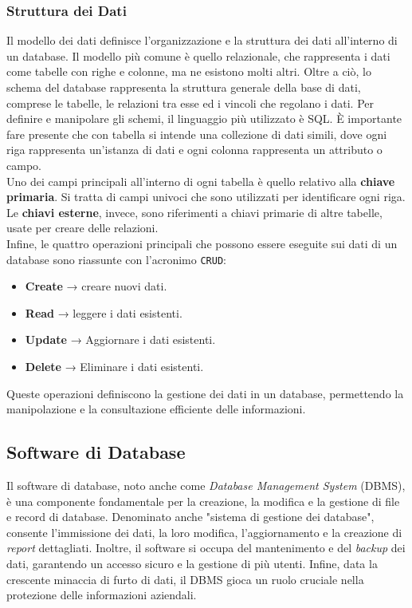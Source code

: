 \subsubsection{Struttura dei Dati}
Il modello dei dati definisce l’organizzazione e la struttura dei dati all’interno di un database. Il modello più comune è quello relazionale, che rappresenta i dati come tabelle con righe e colonne, ma ne esistono molti altri. Oltre a ciò, lo schema del database rappresenta la struttura generale della base di dati, comprese le tabelle, le relazioni tra esse ed i vincoli che regolano i dati. Per definire e manipolare gli schemi, il linguaggio più utilizzato è SQL.\cite{DATABASE_wikipedia} È importante fare presente che con tabella si intende una collezione di dati simili, dove ogni riga rappresenta un’istanza di dati e ogni colonna rappresenta un attributo o campo.\\
Uno dei campi principali all’interno di ogni tabella è quello relativo alla \textbf{chiave primaria}. Si tratta di campi univoci che sono utilizzati per identificare ogni riga. Le \textbf{chiavi esterne}, invece, sono riferimenti a chiavi primarie di altre tabelle, usate per creare delle relazioni.\\
Infine, le quattro operazioni principali che possono essere eseguite sui dati di un database sono riassunte con l’acronimo \texttt{CRUD}:
\begin{itemize}
    \item \textbf{Create} → creare nuovi dati.
    \item \textbf{Read} → leggere i dati esistenti.
    \item \textbf{Update} → Aggiornare i dati esistenti.
    \item \textbf{Delete} → Eliminare i dati esistenti.
\end{itemize}
Queste operazioni definiscono la gestione dei dati in un database,\cite{DATABASE_ionos} permettendo la manipolazione e la consultazione efficiente delle informazioni.

\subsection{Software di Database}

Il software di database, noto anche come \textit{Database Management System} (DBMS), è una componente fondamentale per la creazione, la modifica e la gestione di file e record di database. Denominato anche "sistema di gestione dei database", consente l'immissione dei dati, la loro modifica, l'aggiornamento e la creazione di \textit{report} dettagliati. Inoltre, il software si occupa del mantenimento e del \textit{backup} dei dati, garantendo un accesso sicuro e la gestione di più utenti. Infine, data la crescente minaccia di furto di dati, il DBMS gioca un ruolo cruciale nella protezione delle informazioni aziendali.\cite{DATABASE_oracle}

